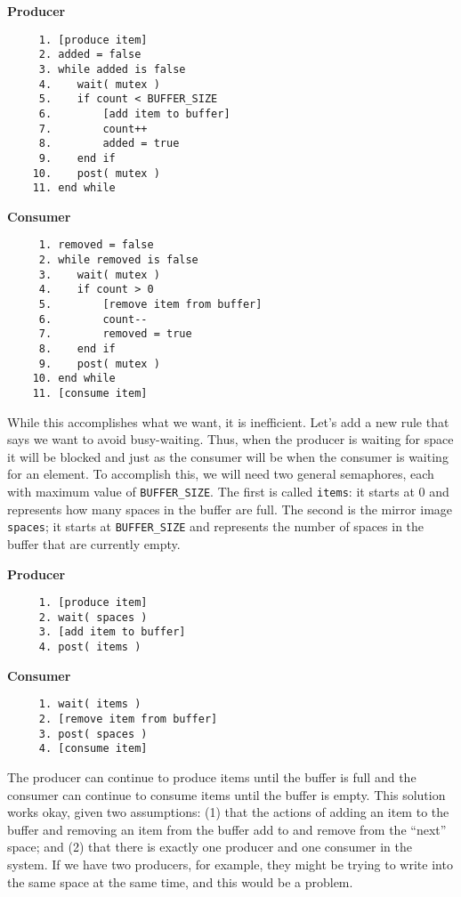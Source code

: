 \begin{multicols}{2}
	\textbf{Producer}\vspace{-2em}
	\begin{verbatim}
	 1. [produce item]
	 2. added = false
	 3. while added is false
	 4.    wait( mutex )
	 5.    if count < BUFFER_SIZE
	 6.        [add item to buffer]
	 7.        count++
	 8.        added = true
	 9.    end if
	10.    post( mutex )
	11. end while
  \end{verbatim}
	\columnbreak
	\textbf{Consumer}\vspace{-2em}
	\begin{verbatim}
	 1. removed = false
	 2. while removed is false
	 3.    wait( mutex )
	 4.    if count > 0
	 5.        [remove item from buffer]
	 6.        count--
	 7.        removed = true
	 8.    end if
	 9.    post( mutex )
	10. end while
	11. [consume item]
  \end{verbatim}
\end{multicols}
\vspace{-2em}


While this accomplishes what we want, it is inefficient. Let's add a new rule that says we want to avoid busy-waiting. Thus, when the producer is waiting for space it will be blocked and just as the consumer will be when the consumer is waiting for an element. To accomplish this, we will need two general semaphores, each with maximum value of \texttt{BUFFER\_SIZE}. The first is called \texttt{items}: it starts at 0 and represents how many spaces in the buffer are full. The second is the mirror image \texttt{spaces}; it starts at \texttt{BUFFER\_SIZE} and represents the number of spaces in the buffer that are currently empty.

\begin{multicols}{2}
	\textbf{Producer}\vspace{-2em}
	\begin{verbatim}
	 1. [produce item]
	 2. wait( spaces )
	 3. [add item to buffer]
	 4. post( items )
  \end{verbatim}
	\columnbreak
	\textbf{Consumer}\vspace{-2em}
	\begin{verbatim}
	 1. wait( items )
	 2. [remove item from buffer]
	 3. post( spaces )
	 4. [consume item]
  \end{verbatim}
\end{multicols}
\vspace{-2em}

The producer can continue to produce items until the buffer is full and the consumer can continue to consume items until the buffer is empty. This solution works okay, given two assumptions: (1) that the actions of adding an item to the buffer and removing an item from the buffer add to and remove from the ``next'' space; and (2) that there is exactly one producer and one consumer in the system. If we have two producers, for example, they might be trying to write into the same space at the same time, and this would be a problem.

